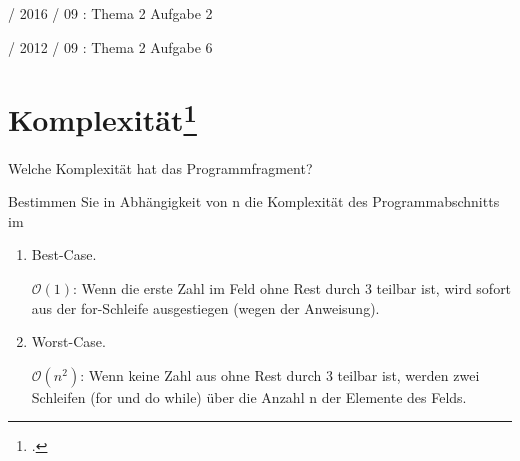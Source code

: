 \documentclass{lehramt-informatik-haupt}
\begin{document}
%

 / 2016 / 09 : Thema 2 Aufgabe 2

%

 / 2012 / 09 : Thema 2 Aufgabe 6

%

\section{Komplexität\footcite[Aufgabe 5]{aud:e-klauusr}}

Welche Komplexität hat das Programmfragment?


\noindent
Bestimmen Sie in Abhängigkeit von n die Komplexität des
Programmabschnitts im

\begin{enumerate}
\item Best-Case.

\begin{antwort}
$\mathcal{O}(1)$: Wenn die erste Zahl im Feld  ohne Rest
durch 3 teilbar ist, wird sofort aus der for-Schleife ausgestiegen
(wegen der  Anweisung).
\end{antwort}

\item Worst-Case.
\begin{antwort}
$\mathcal{O}(n^2)$: Wenn keine Zahl aus  ohne Rest durch 3
teilbar ist, werden zwei Schleifen (for und do while) über die Anzahl n
der Elemente des Felds.
\end{antwort}
\end{enumerate}

\literatur
\end{document}
